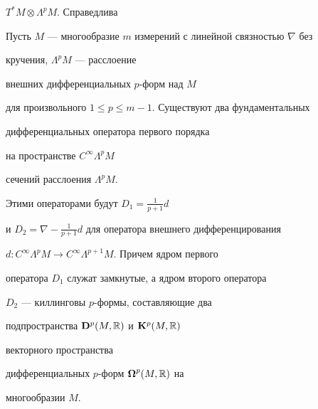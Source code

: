 $T^*M \otimes \Lambda^pM$. Справедлива





\begin{thms}


Пусть $M$ --- многообразие $m$ измерений с линейной связностью $\nabla$ без


кручения, $\Lambda^pM$ --- расслоение 


внешних дифференциальных $p$-форм над $M$


для произвольного $1 \le p \le m - 1$. Существуют два фундаментальных


дифференциальных оператора первого порядка 


на пространстве $C^\infty \Lambda^pM$


сечений расслоения $\Lambda^p M$. 


Этими операторами будут $D_1=\frac{1}{p+1}d$


и $D_2=\nabla -\frac{1}{p+1}d$ для оператора внешнего дифференцирования


$d:C^\infty \Lambda^pM\to C^\infty \Lambda^{p+1}M$. Причем ядром первого


оператора $D_1$ служат замкнутые, а ядром второго оператора


$D_2$ --- киллинговы $p$-формы, составляющие два 


подпространства ${\bold D}^p(M,\Bbb R)$ и ${\bold K}^p(M,\Bbb R)$


векторного пространства 


дифференциальных $p$-форм ${\boldsymbol \Omega}^p(M,\Bbb R)$ на


многообразии $M$.


\end{thms}





